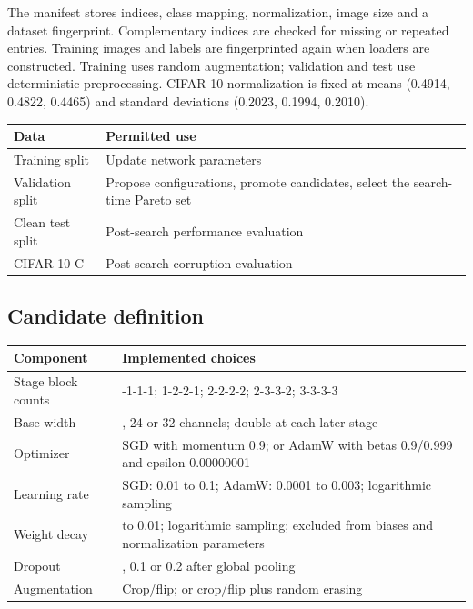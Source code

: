 \documentclass[11pt,a4paper,oneside]{report}
\begin{document}
The manifest stores indices, class mapping, normalization, image size and a dataset fingerprint. Complementary indices are checked for missing or repeated entries. Training images and labels are fingerprinted again when loaders are constructed. Training uses random augmentation; validation and test use deterministic preprocessing. CIFAR-10 normalization is fixed at means (0.4914, 0.4822, 0.4465) and standard deviations (0.2023, 0.1994, 0.2010).

\begin{table}[H]
\centering\small
\renewcommand{\arraystretch}{1.18}
\begin{tabularx}{\textwidth}{>{\raggedright\arraybackslash}p{}>{\raggedright\arraybackslash}X}
\toprule
\textbf{Data} & \textbf{Permitted use} \\
\midrule
Training split & Update network parameters \\
Validation split & Propose configurations, promote candidates, select the search-time Pareto set \\
Clean test split & Post-search performance evaluation \\
CIFAR-10-C & Post-search corruption evaluation \\
\bottomrule
\end{tabularx}
\end{table}

\subsection{Candidate definition}

\begin{table}[H]
\centering\small
\renewcommand{\arraystretch}{1.18}
\begin{tabularx}{\textwidth}{>{\raggedright\arraybackslash}p{}>{\raggedright\arraybackslash}X}
\toprule
\textbf{Component} & \textbf{Implemented choices} \\
\midrule
Stage block counts & 1-1-1-1; 1-2-2-1; 2-2-2-2; 2-3-3-2; 3-3-3-3 \\
Base width & 16, 24 or 32 channels; double at each later stage \\
Optimizer & SGD with momentum 0.9; or AdamW with betas 0.9/0.999 and epsilon 0.00000001 \\
Learning rate & SGD: 0.01 to 0.1; AdamW: 0.0001 to 0.003; logarithmic sampling \\
Weight decay & 0.000001 to 0.01; logarithmic sampling; excluded from biases and normalization parameters \\
Dropout & 0, 0.1 or 0.2 after global pooling \\
Augmentation & Crop/flip; or crop/flip plus random erasing \\
\bottomrule
\end{tabularx}
\end{table}
\end{document}
